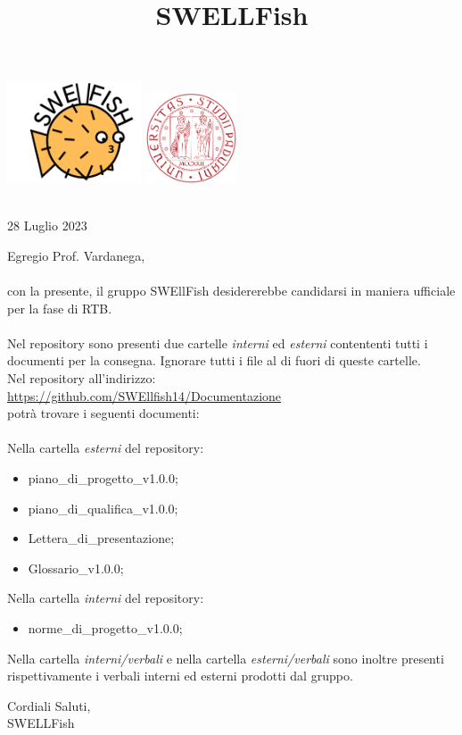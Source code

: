 \documentclass[12pt]{article}
\begin{document}
\graphicspath{ {../templates/img/} }
\title{SWELLFish}

\begin{center}
    \includegraphics[width=0.3\textwidth]{../templates/img/Swellfish_logo.png}
    \hspace{3cm}
    \includegraphics[width=0.2\textwidth]{../templates/img/logoUnipd.png}\\
    \end{center}
    \begin{flushright}
        \
        \textbf{}\\
        28 Luglio 2023
    \end{flushright}  

Egregio Prof. Vardanega,\\\\
con la presente, il gruppo SWEllFish desidererebbe candidarsi in maniera ufficiale
per la fase di RTB.\\\\
Nel repository sono presenti due cartelle \textit{interni} ed \textit{esterni} contententi tutti i documenti per la consegna. Ignorare tutti i file
al di fuori di queste cartelle.\\
Nel repository all'indirizzo: \\
\href{https://github.com/SWEllfish14/Documentazione}{\underline{https://github.com/SWEllfish14/Documentazione}}\\ 
potrà trovare i seguenti documenti:\\\\

Nella cartella \textit{esterni} del repository:
\begin{itemize}
\item piano\_di\_progetto\_v1.0.0;
\item piano\_di\_qualifica\_v1.0.0;
\item Lettera\_di\_presentazione;
\item Glossario\_v1.0.0;
\end{itemize}
Nella cartella \textit{interni} del repository:
\begin{itemize}
    \item norme\_di\_progetto\_v1.0.0;
\end{itemize}
 Nella cartella \textit{interni/verbali} e nella cartella \textit{esterni/verbali} sono inoltre presenti rispettivamente i verbali interni ed esterni prodotti dal gruppo. 

\begin{flushright}
Cordiali Saluti,\\
SWELLFish
\end{flushright}
\end{document}
